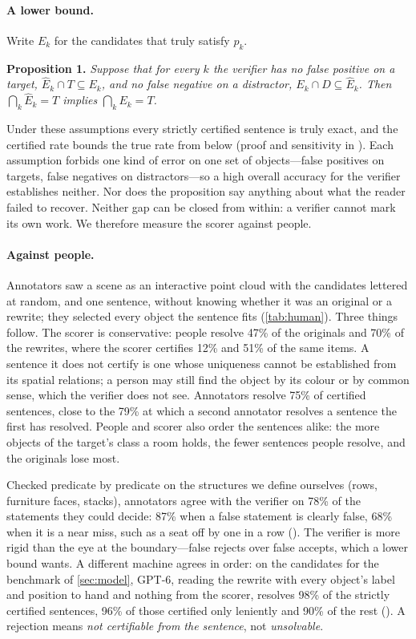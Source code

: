 \paragraph{A lower bound.}
Write $E_k$ for the candidates that truly satisfy $p_k$.

\noindent\textbf{Proposition 1.} \emph{Suppose that for every $k$ the verifier has no false positive on a target, $\hat{E}_k \cap T \subseteq E_k$, and no false negative on a distractor, $E_k \cap D \subseteq \hat{E}_k$. Then $\bigcap_k \hat{E}_k = T$ implies $\bigcap_k E_k = T$.}

\noindent Under these assumptions every strictly certified sentence is truly exact, and the certified rate bounds the true rate from below (proof and sensitivity in ).
Each assumption forbids one kind of error on one set of objects---false positives on targets, false negatives on distractors---so a high overall accuracy for the verifier establishes neither.
Nor does the proposition say anything about what the reader failed to recover.
Neither gap can be closed from within: a verifier cannot mark its own work.
We therefore measure the scorer against people.

\paragraph{Against people.}
Annotators saw a scene as an interactive point cloud with the candidates lettered at random, and one sentence, without knowing whether it was an original or a rewrite; they selected every object the sentence fits (\cref{tab:human}).
Three things follow.
The scorer is conservative: people resolve 47\% of the originals and 70\% of the rewrites, where the scorer certifies 12\% and 51\% of the same items.
A sentence it does not certify is one whose uniqueness cannot be established from its spatial relations; a person may still find the object by its colour or by common sense, which the verifier does not see.
Annotators resolve 75\% of certified sentences, close to the 79\% at which a second annotator resolves a sentence the first has resolved.
People and scorer also order the sentences alike: the more objects of the target's class a room holds, the fewer sentences people resolve, and the originals lose most.

Checked predicate by predicate on the structures we define ourselves (rows, furniture faces, stacks), annotators agree with the verifier on 78\% of the statements they could decide: 87\% when a false statement is clearly false, 68\% when it is a near miss, such as a seat off by one in a row ().
The verifier is more rigid than the eye at the boundary---false rejects over false accepts, which a lower bound wants.
A different machine agrees in order: on the candidates for the benchmark of \cref{sec:model}, GPT-6, reading the rewrite with every object's label and position to hand and nothing from the scorer, resolves 98\% of the strictly certified sentences, 96\% of those certified only leniently and 90\% of the rest ().
A rejection means \emph{not certifiable from the sentence}, not \emph{unsolvable}.

